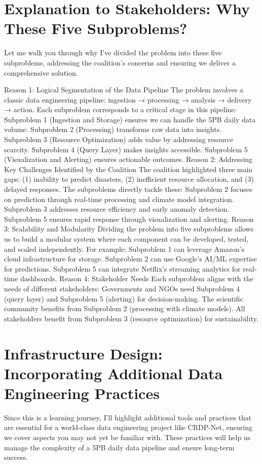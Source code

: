 \documentclass[10pt]{article}
\begin{document}
\section{Explanation to Stakeholders: Why These Five Subproblems?}
Let me walk you through why I’ve divided the problem into these five subproblems, addressing the coalition’s concerns and ensuring we deliver a comprehensive solution.

Reason 1: Logical Segmentation of the Data Pipeline
The problem involves a classic data engineering pipeline: ingestion → processing → analysis → delivery → action. Each subproblem corresponds to a critical stage in this pipeline:
Subproblem 1 (Ingestion and Storage) ensures we can handle the 5PB daily data volume.
Subproblem 2 (Processing) transforms raw data into insights.
Subproblem 3 (Resource Optimization) adds value by addressing resource scarcity.
Subproblem 4 (Query Layer) makes insights accessible.
Subproblem 5 (Visualization and Alerting) ensures actionable outcomes.
Reason 2: Addressing Key Challenges Identified by the Coalition
The coalition highlighted three main gaps: (1) inability to predict disasters, (2) inefficient resource allocation, and (3) delayed responses. The subproblems directly tackle these:
Subproblem 2 focuses on prediction through real-time processing and climate model integration.
Subproblem 3 addresses resource efficiency and early anomaly detection.
Subproblem 5 ensures rapid response through visualization and alerting.
Reason 3: Scalability and Modularity
Dividing the problem into five subproblems allows us to build a modular system where each component can be developed, tested, and scaled independently. For example:
Subproblem 1 can leverage Amazon’s cloud infrastructure for storage.
Subproblem 2 can use Google’s AI/ML expertise for predictions.
Subproblem 5 can integrate Netflix’s streaming analytics for real-time dashboards.
Reason 4: Stakeholder Needs
Each subproblem aligns with the needs of different stakeholders:
Governments and NGOs need Subproblem 4 (query layer) and Subproblem 5 (alerting) for decision-making.
The scientific community benefits from Subproblem 2 (processing with climate models).
All stakeholders benefit from Subproblem 3 (resource optimization) for sustainability.

\section{Infrastructure Design: Incorporating Additional Data Engineering Practices}
Since this is a learning journey, I’ll highlight additional tools and practices that are essential for a world-class data engineering project like CRDP-Net, ensuring we cover aspects you may not yet be familiar with. These practices will help us manage the complexity of a 5PB daily data pipeline and ensure long-term success.
\end{document}
